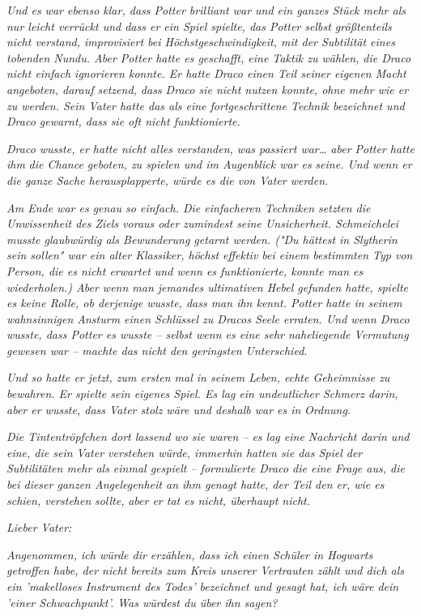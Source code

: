 {\emph{Und es war ebenso klar, dass Potter brilliant war und ein ganzes Stück mehr als nur leicht verrückt und dass er ein Spiel spielte, das Potter selbst größtenteils nicht verstand, improvisiert bei Höchstgeschwindigkeit, mit der Subtilität eines tobenden Nundu. Aber Potter hatte es geschafft, eine Taktik zu wählen, die Draco nicht einfach ignorieren konnte. Er hatte Draco einen Teil seiner eigenen Macht angeboten, darauf setzend, dass Draco sie nicht nutzen konnte, ohne mehr wie er zu werden. Sein Vater hatte das als eine fortgeschrittene Technik bezeichnet und Draco gewarnt, dass sie oft nicht funktionierte.}

\emph{Draco wusste, er hatte nicht alles verstanden, was passiert war… aber Potter hatte} \emph{\emph{ihm}} \emph{die Chance geboten, zu spielen und im Augenblick war es} \emph{\emph{seine}. Und wenn er die ganze Sache herausplapperte, würde es die von Vater werden.}

\emph{Am Ende war es genau so einfach. Die einfacheren Techniken setzten die Unwissenheit des Ziels voraus oder zumindest seine Unsicherheit. Schmeichelei musste glaubwürdig als Bewunderung getarnt werden. ("Du hättest in Slytherin sein sollen" war ein alter Klassiker, höchst effektiv bei einem bestimmten Typ von Person, die es nicht erwartet und wenn es funktionierte, konnte man es wiederholen.) Aber wenn man jemandes ultimativen Hebel gefunden hatte, spielte es keine Rolle, ob derjenige wusste, dass man ihn kennt. Potter hatte in seinem wahnsinnigen Ansturm einen Schlüssel zu Dracos Seele erraten. Und wenn Draco wusste, dass Potter es wusste -- selbst wenn es eine sehr naheliegende Vermutung gewesen war -- machte das nicht den geringsten Unterschied.}

\emph{Und so hatte er jetzt, zum ersten mal in seinem Leben, echte Geheimnisse zu bewahren. Er spielte sein eigenes Spiel. Es lag ein undeutlicher Schmerz darin, aber er wusste, dass Vater stolz wäre und deshalb war es in} \emph{Ordnung.}

\emph{Die Tintentröpfchen dort lassend wo sie waren -- es lag eine Nachricht darin und eine, die sein Vater verstehen würde, immerhin hatten sie das Spiel der Subtilitäten mehr als einmal gespielt -- formulierte Draco die eine Frage aus, die bei dieser ganzen Angelegenheit an ihm genagt hatte, der Teil den er, wie es schien, verstehen} \emph{\emph{sollte,}} \emph{aber er tat es nicht, überhaupt nicht.}

\emph{\emph{Lieber Vater:}}

\emph{\emph{Angenommen, ich würde dir erzählen, dass ich einen Schüler in Hogwarts getroffen habe, der nicht bereits zum Kreis unserer Vertrauten zählt und dich als ein 'makelloses Instrument des Todes' bezeichnet und gesagt hat, ich wäre dein 'einer Schwachpunkt'. Was würdest du über ihn sagen?}}

}
